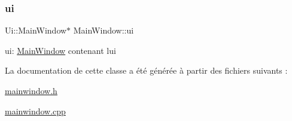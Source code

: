 \subsubsection{\texorpdfstring{ui}{ui}}
{\footnotesize\ttfamily Ui\+::\+Main\+Window$\ast$ Main\+Window\+::ui\hspace{0.3cm}{\ttfamily [private]}}

ui\+: \hyperlink{classMainWindow}{Main\+Window} contenant l\textquotesingle{}ui 

La documentation de cette classe a été générée à partir des fichiers suivants \+:\begin{DoxyCompactItemize}
\item 
\hyperlink{mainwindow_8h}{mainwindow.\+h}\item 
\hyperlink{mainwindow_8cpp}{mainwindow.\+cpp}\end{DoxyCompactItemize}
